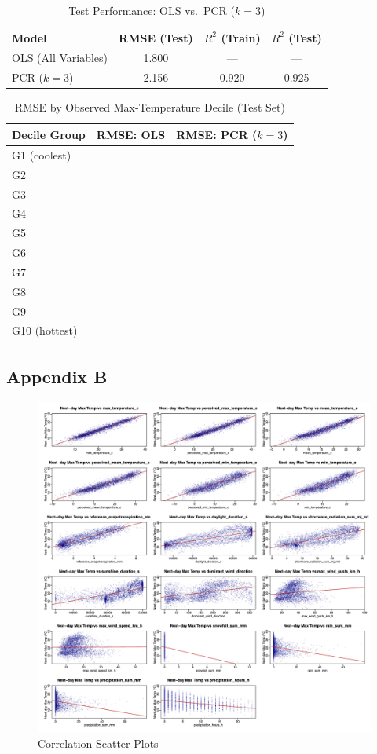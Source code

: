 \documentclass[
]{article}
\begin{document}
\begin{table}[!htbp]\centering
\caption{Test Performance: OLS vs.\ PCR ($k=3$)}
\label{tab:A7}
\begin{tabular}{lccc}
\toprule
Model & RMSE (Test) & $R^{2}$ (Train) & $R^{2}$ (Test) \\
\midrule
OLS (All Variables) & 1.800 & --- & --- \\
PCR ($k=3$) & 2.156 & 0.920 & 0.925 \\
\bottomrule
\end{tabular}
\end{table}

\begin{table}[!htbp]\centering
\caption{RMSE by Observed Max-Temperature Decile (Test Set)}
\label{tab:A8}
\begin{tabular}{lcc}
\toprule
Decile Group & RMSE: OLS & RMSE: PCR ($k=3$) \\
\midrule
G1 (coolest) &  &  \\
G2 &  &  \\
G3 &  &  \\
G4 &  &  \\
G5 &  &  \\
G6 &  &  \\
G7 &  &  \\
G8 &  &  \\
G9 &  &  \\
G10 (hottest) &  &  \\
\bottomrule
\end{tabular}
\end{table}

\subsection{Appendix B}\label{appendix-b}

\begin{figure}[H]
\includegraphics[width=0.0082\linewidth,keepaspectratio]{scatterplot} \caption{Correlation Scatter Plots}\label{fig:unnamed-chunk-1}
\end{figure}
\end{document}
